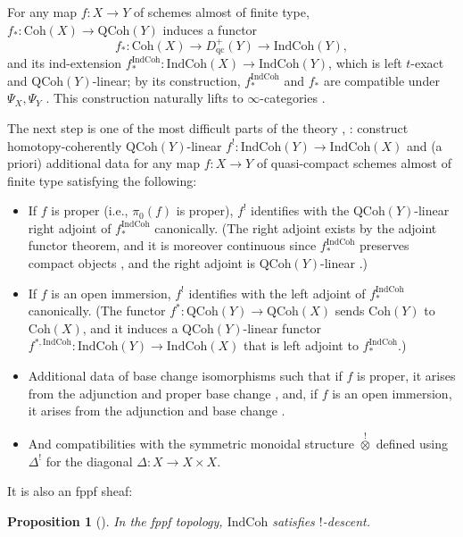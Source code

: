 \documentclass{amsart}
\newtheorem{proposition}[theorem]{Proposition}
\theoremstyle{definition}
\theoremstyle{remark}
\numberwithin{equation}{section}
\newcommand{\IndCoh}{\mathrm{IndCoh}}
\newcommand{\QCoh}{\mathrm{QCoh}}
\newcommand{\Coh}{\mathrm{Coh}}
\newcommand{\qc}{\mathrm{qc}}
\begin{document}
For any map $f\colon X\to Y$ of schemes almost of finite type, $f_*\colon \Coh(X)\to \QCoh (Y)$ induces a functor
\[
f_*\colon \Coh(X)\to D_{\qc}^+(Y)\to \IndCoh (Y),  
\]
and its ind-extension $f_*^{\IndCoh}\colon \IndCoh (X)\to \IndCoh(Y)$, which is left $t$-exact and $\QCoh (Y)$-linear; by its construction, $f_*^{\IndCoh}$ and $f_*$ are compatible under $\Psi_X, \Psi_Y$ \cite[Proposition 3.1.1, Proposition 3.1.3]{GaitsgoryIndCohSheaves}. This construction naturally lifts to $\infty$-categories \cite[Proposition 3.2.4]{GaitsgoryIndCohSheaves}.

The next step is one of the most difficult parts of the theory \cite[Theorem 5.2.2]{GaitsgoryIndCohSheaves}, \cite{GRI}: construct homotopy-coherently $\QCoh(Y)$-linear $f^!\colon \IndCoh(Y)\to \IndCoh(X)$ and (a priori) additional data for any map $f\colon X\to Y$ of quasi-compact schemes almost of finite type satisfying the following:
\begin{itemize}
    \item If $f$ is proper (i.e., $\pi_0(f)$ is proper), $f^!$ identifies with the $\QCoh(Y)$-linear right adjoint of $f_*^{\IndCoh}$ canonically. (The right adjoint exists by the adjoint functor theorem, and it is moreover continuous since $f_*^{\IndCoh}$ preserves compact objects \cite[Corollary 3.3.6]{GaitsgoryIndCohSheaves}, and the right adjoint is $\QCoh(Y)$-linear \cite[Corollary 3.3.11]{GaitsgoryIndCohSheaves}.)  
    \item If $f$ is an open immersion, $f^!$ identifies with the left adjoint of $f_*^{\IndCoh}$ canonically. (The functor $f^*\colon \QCoh(Y)\to \QCoh(X)$ sends $\Coh(Y)$ to $\Coh(X)$, and it induces a $\QCoh(Y)$-linear functor $f^{*, \IndCoh}\colon \IndCoh(Y)\to \IndCoh(X)$ that is left adjoint to $f_*^{\IndCoh}$.)
    \item Additional data of base change isomorphisms such that if $f$ is proper, it arises from the adjunction and proper base change \cite[Proposition 3.4.2]{GaitsgoryIndCohSheaves}, and, if $f$ is an open immersion, it arises from the adjunction and base change \cite[Lemma 3.6.9]{GaitsgoryIndCohSheaves}.
    \item And compatibilities with the symmetric monoidal structure $\overset{!}{\otimes}$ defined using $\Delta^!$ for the diagonal $\Delta\colon X\to X\times X$. 
\end{itemize}

It is also an fppf sheaf:

\begin{proposition}[{\cite[Theorem 8.3.2]{GaitsgoryIndCohSheaves}}]
In the fppf topology, $\IndCoh$ satisfies $!$-descent.      
\end{proposition}
\end{document}
